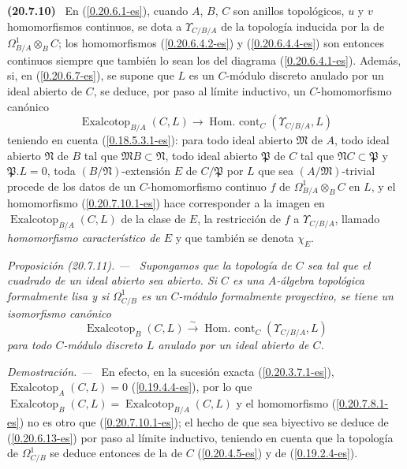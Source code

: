 \documentclass[10pt,oneside]{book}
\makeatletter
\newcommand{\sref}[1]{\textup{(\ref{#1})}}
\newcommand{\setmanualcurrentlabel}[1]{\def\@currentlabel{#1}}
\newenvironment{env}[1][]{\setmanualcurrentlabel{#1}\par\medskip\noindent\textbf{(#1)}\ }{\par}
\newenvironment{proposition}[1][]{%
  \setmanualcurrentlabel{#1}\par\medskip\noindent\itshape Proposición (#1). ---\ }{\par}
\newenvironment{proof}{%
  \par\medskip\noindent\textit{Demostración. ---\ }}{\par}
\makeatother
\begin{document}
\begin{env}[20.7.10]
\label{0.20.7.10-es}
En \sref{0.20.6.1-es}, cuando $A$, $B$, $C$ son anillos topológicos,
$u$ y $v$ homomorfismos continuos, se dota a $\Upsilon_{C/B/A}$ de la
topología inducida por la de $\Omega^1_{B/A}\otimes_B C$; los
homomorfismos \sref{0.20.6.4.2-es} y \sref{0.20.6.4.4-es} son entonces
continuos siempre que también lo sean los del diagrama
\sref{0.20.6.4.1-es}. Además, si, en \sref{0.20.6.7-es}, se supone que
$L$ es un $C$-módulo discreto anulado por un ideal abierto de $C$, se deduce,
por paso al límite inductivo, un $C$-homomorfismo canónico
\begin{equation}
\tag{20.7.10.1}
\label{0.20.7.10.1-es}
  \operatorname{Exalcotop}_{B/A}(C,L)\to
  \operatorname{Hom.\ cont}_C(\Upsilon_{C/B/A},L)
\end{equation}
teniendo en cuenta \sref{0.18.5.3.1-es}: para todo ideal abierto
$\mathfrak{M}$ de $A$, todo ideal abierto $\mathfrak{N}$ de $B$ tal que
$\mathfrak{M}B\subset\mathfrak{N}$, todo ideal abierto $\mathfrak{P}$ de $C$
tal que $\mathfrak{N}C\subset\mathfrak{P}$ y $\mathfrak{P}.L=0$, toda
$(B/\mathfrak{N})$-extensión $E$ de $C/\mathfrak{P}$ por $L$ que sea
$(A/\mathfrak{M})$-trivial procede de los datos de un $C$-homomorfismo
continuo $f$ de $\Omega^1_{B/A}\otimes_B C$ en $L$, y el homomorfismo
\sref{0.20.7.10.1-es} hace corresponder a la imagen en
$\operatorname{Exalcotop}_{B/A}(C,L)$ de la clase de $E$, la restricción de
$f$ a $\Upsilon_{C/B/A}$, llamado \emph{homomorfismo característico de $E$}
y que también se denota $\chi_E$.
\end{env}

\begin{proposition}[20.7.11]
\label{0.20.7.11-es}
Supongamos que la topología de $C$ sea tal que el cuadrado de un ideal abierto
sea abierto. Si $C$ es una $A$-álgebra topológica formalmente lisa y si
$\Omega^1_{C/B}$ es un $C$-módulo formalmente proyectivo, se tiene un
isomorfismo canónico
\begin{equation}
\tag{20.7.11.1}
\label{0.20.7.11.1-es}
  \operatorname{Exalcotop}_B(C,L)\xrightarrow{\sim}
  \operatorname{Hom.\ cont}_C(\Upsilon_{C/B/A},L)
\end{equation}
para todo $C$-módulo discreto $L$ anulado por un ideal abierto de $C$.
\end{proposition}

\begin{proof}
En efecto, en la sucesión exacta \sref{0.20.3.7.1-es},
$\operatorname{Exalcotop}_A(C,L)=0$ \sref{0.19.4.4-es}, por lo que
$\operatorname{Exalcotop}_B(C,L)=\operatorname{Exalcotop}_{B/A}(C,L)$ y
el homomorfismo \sref{0.20.7.8.1-es} no es otro que
\sref{0.20.7.10.1-es}; el hecho de que sea biyectivo se deduce de
\sref{0.20.6.13-es} por paso al límite inductivo, teniendo en cuenta que
la topología de $\Omega^1_{C/B}$ se deduce entonces de la de $C$
\sref{0.20.4.5-es} y de \sref{0.19.2.4-es}.
\end{proof}
\end{document}
